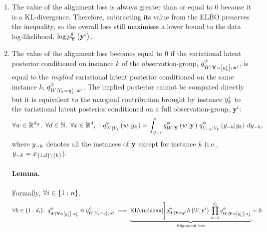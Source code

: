 \documentclass[../thesis.tex]{subfiles}
\begin{document}
\begin{enumerate}
    \item The value of the alignment loss is always greater than or equal to 0 because it is a KL-divergence. Therefore, subtracting its value from the ELBO preserves the inequality, so the overall loss still maximises a lower bound to the data log-likelihood, $\log \myfunc{p}^{\theta}_{\mygroup{\myrv{y}}} \left( \mygroup{\myvect{y}}^i \right)$.
    \item The value of the alignment loss becomes equal to 0 if the variational latent posterior conditioned on instance $k$ of the observation-group, $\myfunc{q}^{\phi}_{\myrv{w} | \mygroup{\myrv{y}} = \left[ \myvect{y}^i_k \right]; \, \mygroup{x}^i}$, is equal to the \textit{implied} variational latent posterior conditioned on the same instance $k$, $\myfunc{q}^{\phi}_{\myrv{w} | \myrv{y}_k = \myvect{y}^i_k; \, \mygroup{\myvect{x}}^i}$. The implied posterior cannot be computed directly but it is equivalent to the marginal contribution brought by instance $y^i_k$ to the variational latent posterior conditioned on a full observation-group, $\mathbf{{y}}^i$:
    \begin{equation} \label{eq:MIVAE-implied}
        \forall \myvect{w} \in \mathbb{R}^{\mydim{z}}, ~ \forall \mycnt{d} \in \mathbb{N}, ~ \forall \myvect{x} \in \mathbb{R}^{\mycnt{d}}, \quad \myfunc{q}^{\phi}_{\myrv{w} | \myrv{y}_k} \left( \myvect{w} \left\vert \myvect{y}_k \right. \right) = \int_{\myvect{y}_{-k}} \myfunc{q}^{\phi}_{\myrv{w} | \mygroup{\myrv{y}}} \left( \myvect{w} \left\vert \mygroup{\myvect{y}} \right. \right) \, \myfunc{q}^{\phi}_{\myrv{y}_{-k} | \myrv{y}_k} \left( \myvect{y}_{-k} | \myvect{y}_k \right) \, d\myvect{y}_{-k},
    \end{equation}
    where $y_{-k}$ denotes all the instances of $\mathbf{{y}}$ except for instance $k$ (i.e., $y_{-k} = x_{\{1:d\} \setminus \{k\}}$).

    \paragraph{Lemma.} Formally, $\forall i \in \{1 : n\}$, 
    \[
        \forall k \in \{1 : \mycnt{d}_i\}, 
        ~ \myfunc{q}^{\phi}_{\myrv{w} | \mygroup{\myrv{y}} = \left[ \myvect{y}^i_k \right]; \, \myvect{x}^i_k} \equiv \myfunc{q}^{\phi}_{\myrv{w} | \myrv{y}_k = \myvect{y}^i_k; \, \mygroup{\myvect{x}}^i}
        \implies 
        \underbrace{
            \kl[\Bigg]{ \myfunc{q}^{\phi}_{\myrv{w} | \mygroup{\myrv{y}} = \mygroup{\myvect{y}}^i} }{ \myfunc{h} \left( \myrv{w}, \mygroup{\myvect{y}}^i \right) \, \prod_{k=1}^{\mycnt{d}_i} \myfunc{q}^{\phi}_{\myrv{w} | \mygroup{\myrv{y}} = \left[ \myvect{y}^i_k \right]; \, \myvect{x}^i_k }}
        }_{\text{Alignment loss}} = 0.
    \]


\end{enumerate}
\end{document}
